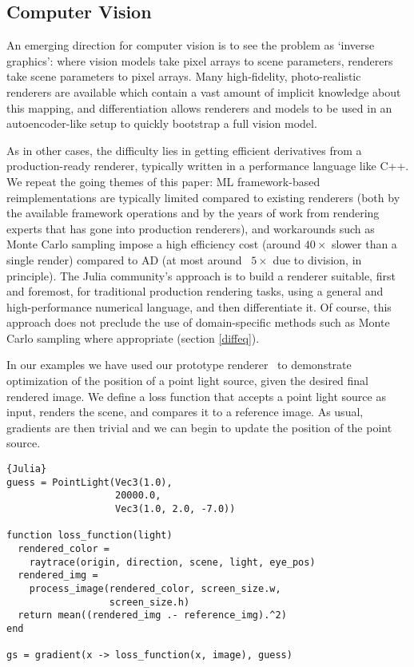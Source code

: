 \documentclass{juliacon}
\begin{document}
\subsection{Computer Vision}

An emerging direction for computer vision is to see the problem as `inverse graphics': where vision models take pixel arrays to scene parameters, renderers take scene parameters to pixel arrays. Many high-fidelity, photo-realistic renderers are available which contain a vast amount of implicit knowledge about this mapping, and differentiation allows renderers and models to be used in an autoencoder-like setup to quickly bootstrap a full vision model.

As in other cases, the difficulty lies in getting efficient derivatives from a production-ready renderer, typically written in a performance language like C++. We repeat the going themes of this paper: ML framework-based reimplementations are typically limited compared to existing renderers (both by the available framework operations and by the years of work from rendering experts that has gone into production renderers), and workarounds such as Monte Carlo sampling \cite{li2018differentiable} impose a high efficiency cost (around $40\times$ slower than a single render) compared to AD (at most around ~$5\times$ due to division, in principle). The Julia community's approach is to build a renderer suitable, first and foremost, for traditional production rendering tasks, using a general and high-performance numerical language, and then differentiate it. Of course, this approach does not preclude the use of domain-specific methods such as Monte Carlo sampling where appropriate (section \ref{diffeq}).

In our examples we have used our prototype renderer~\cite{diffrender} to demonstrate optimization of the position of a point light source, given the desired final rendered image. We define a loss function that accepts a point light source as input, renders the scene, and compares it to a reference image. As usual, gradients are then trivial and we can begin to update the position of the point source.

\begin{lstlisting}{Julia}
guess = PointLight(Vec3(1.0),
                   20000.0,
                   Vec3(1.0, 2.0, -7.0))

function loss_function(light)
  rendered_color =
    raytrace(origin, direction, scene, light, eye_pos)
  rendered_img =
    process_image(rendered_color, screen_size.w,
                  screen_size.h)
  return mean((rendered_img .- reference_img).^2)
end

gs = gradient(x -> loss_function(x, image), guess) 
\end{lstlisting}
\end{document}
